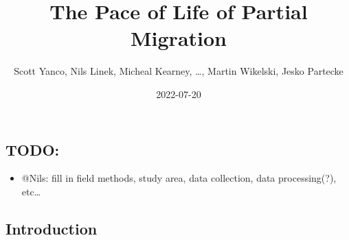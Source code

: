 \documentclass[
]{article}
\title{The Pace of Life of Partial Migration}
\author{Scott Yanco, Nils Linek, Micheal Kearney, \ldots, Martin
Wikelski, Jesko Partecke}
\date{2022-07-20}
\providecommand{\tightlist}{%
  \setlength{\itemsep}{0pt}\setlength{\parskip}{0pt}}
\begin{document}
\maketitle

\hypertarget{todo}{%
\subsection{TODO:}\label{todo}}

\begin{itemize}
\tightlist
\item
  @Nils: fill in field methods, study area, data collection, data
  processing(?), etc\ldots{}
\end{itemize}

\hypertarget{introduction}{%
\subsection{Introduction}\label{introduction}}
\end{document}
